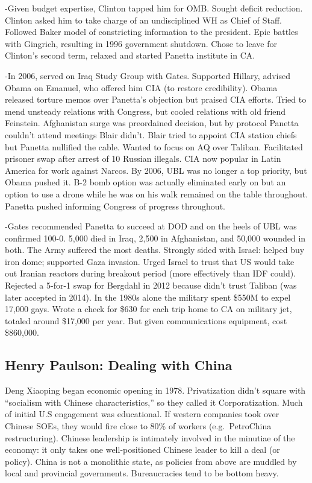 \documentclass[
]{article}
\begin{document}
-Given budget expertise, Clinton tapped him for OMB. Sought deficit
reduction. Clinton asked him to take charge of an undisciplined WH as
Chief of Staff. Followed Baker model of constricting information to the
president. Epic battles with Gingrich, resulting in 1996 government
shutdown. Chose to leave for Clinton's second term, relaxed and started
Panetta institute in CA.

-In 2006, served on Iraq Study Group with Gates. Supported Hillary,
advised Obama on Emanuel, who offered him CIA (to restore credibility).
Obama released torture memos over Panetta's objection but praised CIA
efforts. Tried to mend unsteady relations with Congress, but cooled
relations with old friend Feinstein. Afghanistan surge was preordained
decision, but by protocol Panetta couldn't attend meetings Blair didn't.
Blair tried to appoint CIA station chiefs but Panetta nullified the
cable. Wanted to focus on AQ over Taliban. Facilitated prisoner swap
after arrest of 10 Russian illegals. CIA now popular in Latin America
for work against Narcos. By 2006, UBL was no longer a top priority, but
Obama pushed it. B-2 bomb option was actually eliminated early on but an
option to use a drone while he was on his walk remained on the table
throughout. Panetta pushed informing Congress of progress throughout.

-Gates recommended Panetta to succeed at DOD and on the heels of UBL was
confirmed 100-0. 5,000 died in Iraq, 2,500 in Afghanistan, and 50,000
wounded in both. The Army suffered the most deaths. Strongly sided with
Israel: helped buy iron dome; supported Gaza invasion. Urged Israel to
trust that US would take out Iranian reactors during breakout period
(more effectively than IDF could). Rejected a 5-for-1 swap for Bergdahl
in 2012 because didn't trust Taliban (was later accepted in 2014). In
the 1980s alone the military spent \$550M to expel 17,000 gays. Wrote a
check for \$630 for each trip home to CA on military jet, totaled around
\$17,000 per year. But given communications equipment, cost \$860,000.

\hypertarget{henry-paulson-dealing-with-china}{%
\subsection{Henry Paulson: Dealing with
China}\label{henry-paulson-dealing-with-china}}

Deng Xiaoping began economic opening in 1978. Privatization didn't
square with ``socialism with Chinese characteristics,'' so they called
it Corporatization. Much of initial U.S engagement was educational. If
western companies took over Chinese SOEs, they would fire close to 80\%
of workers (e.g.~PetroChina restructuring). Chinese leadership is
intimately involved in the minutiae of the economy: it only takes one
well-positioned Chinese leader to kill a deal (or policy). China is not
a monolithic state, as policies from above are muddled by local and
provincial governments. Bureaucracies tend to be bottom heavy.
\end{document}
